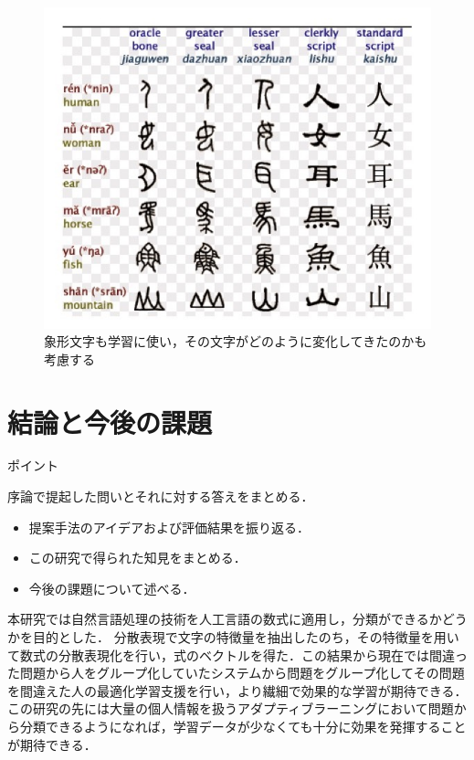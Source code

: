 \documentclass[a4j,11pt,report]{jsbook}
\newcommand{\point}[1]{
\begin{itembox}[l]{ポイント}
  #1
\end{itembox}
}
\begin{document}
\begin{center}
  \begin{figure}[H]
    \centering
    \includegraphics[width=\linewidth]{image/kannji2.jpeg}
    \caption{象形文字も学習に使い，その文字がどのように変化してきたのかも考慮する}
    \label{fig:kannji2}
  \end{figure}
\end{center}




\chapter{結論と今後の課題 \label{ch:conclusion}}
\point{
序論で提起した問いとそれに対する答えをまとめる．
\begin{itemize}
  \item 提案手法のアイデアおよび評価結果を振り返る．
  \item この研究で得られた知見をまとめる．
  \item 今後の課題について述べる．
\end{itemize}
}
\fi

本研究では自然言語処理の技術を人工言語の数式に適用し，分類ができるかどうかを目的とした．
分散表現で文字の特徴量を抽出したのち，その特徴量を用いて数式の分散表現化を行い，式のベクトルを得た．この結果から現在では間違った問題から人をグループ化していたシステムから問題をグループ化してその問題を間違えた人の最適化学習支援を行い，より繊細で効果的な学習が期待できる．
この研究の先には大量の個人情報を扱うアダプティブラーニングにおいて問題から分類できるようになれば，学習データが少なくても十分に効果を発揮することが期待できる．
\end{document}
